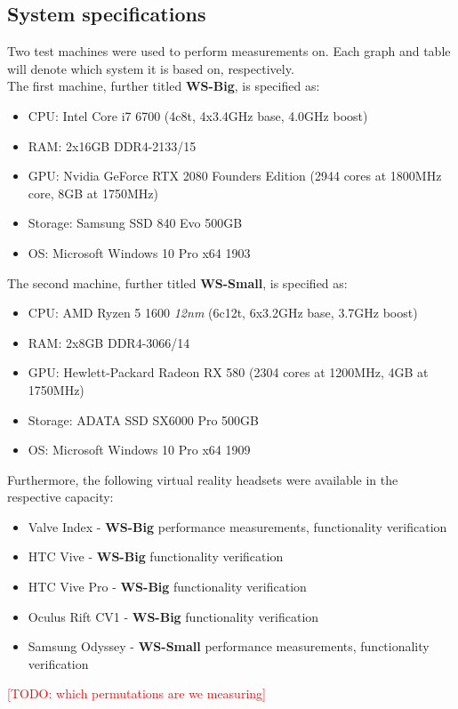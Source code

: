\subsection{System specifications}
Two test machines were used to perform measurements on. Each graph and table will denote which system it is based on, respectively. \\
The first machine, further titled \textbf{WS-Big}, is specified as:
\begin{itemize}
\item CPU: Intel Core i7 6700 (4c8t, 4x3.4GHz base, 4.0GHz boost)
\item RAM: 2x16GB DDR4-2133/15
\item GPU: Nvidia GeForce RTX 2080 Founders Edition (2944 cores at 1800MHz core, 8GB at 1750MHz)
\item Storage: Samsung SSD 840 Evo 500GB
\item OS: Microsoft Windows 10 Pro x64 1903
\end{itemize} 
The second machine, further titled \textbf{WS-Small}, is specified as:
\begin{itemize}
\item CPU: AMD Ryzen 5 1600 \textit{12nm} (6c12t, 6x3.2GHz base, 3.7GHz boost)
\item RAM: 2x8GB DDR4-3066/14
\item GPU: Hewlett-Packard Radeon RX 580 (2304 cores at 1200MHz, 4GB at 1750MHz)
\item Storage: ADATA SSD SX6000 Pro 500GB
\item OS: Microsoft Windows 10 Pro x64 1909
\end{itemize} 
Furthermore, the following virtual reality headsets were available in the respective capacity:
\begin{itemize}
\item Valve Index - \textbf{WS-Big} performance measurements, functionality verification
\item HTC Vive - \textbf{WS-Big} functionality verification
\item HTC Vive Pro - \textbf{WS-Big} functionality verification
\item Oculus Rift CV1 - \textbf{WS-Big} functionality verification
\item Samsung Odyssey - \textbf{WS-Small} performance measurements, functionality verification
\end{itemize} 

\textcolor{red}{[TODO: which permutations are we measuring]}
